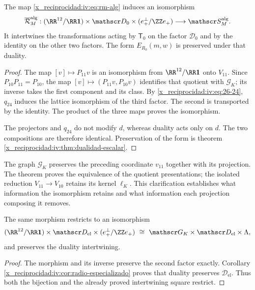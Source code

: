 \begin{theorem}
\label{x_reciprocidad:iv:thm:pantallas-isomorfas}
\label{x_reciprocidad:thm:k-pantallas-coordinadas}
The map \eqref{x_reciprocidad:iv:eq:rm-alg} induces an isomorphism
\[
 \overline{\mathcal R}_M^{\mathrm{alg}}:
 (\RR^{12}/\RR\mathbf1)\times\mathscr D_0
 \times(e_+^\perp/\ZZ e_+)
 \longrightarrow\mathscr S_M^{\mathrm{alg}}.
\]
It intertwines the transformations acting by \(\mathsf T_0\)
on the factor \(\mathscr D_0\) and by the identity on the
other two factors. The form \(E_{R_0}(m,w)\) is preserved
under that duality.
\end{theorem}
\begin{proof}
The map \([v]\mapsto P_{11}v\) is an isomorphism
from \(\RR^{12}/\RR\mathbf1\) onto \(V_{11}\).
Since \(P_{10}P_{11}=P_{10}\), the map
\([v]\mapsto(P_{11}v,P_{10}v)\) identifies that quotient
with \(\mathscr G_K\); its inverse takes the first component
and its class. By \eqref{x_reciprocidad:iv:eq:26-24}, \(q_{24}\) induces the
lattice isomorphism of the third factor. The second is
transported by the identity. The product of the three
maps proves the isomorphism.

The projectors and \(q_{24}\) do not modify \(d\), whereas
duality acts only on \(d\). The two
compositions are therefore identical. Preservation of the form
is theorem \ref{x_reciprocidad:iv:thm:dualidad-escalar}.
\end{proof}

The graph \(\mathscr G_K\) preserves the preceding coordinate
\(v_{11}\) together with its projection. The theorem proves
the equivalence of the quotient presentations; the isolated
reduction \(V_{11}\to V_{10}\) retains its kernel
\(\ell_K\). This clarification establishes what information
the isomorphism retains and what information each
projection composing it removes.

\begin{corollary}
The same morphism restricts to an isomorphism
\[
 (\RR^{12}/\RR\mathbf1)\times\mathscr D_{\mathrm{el}}
 \times(e_+^\perp/\ZZ e_+)
 \ \cong\ \mathscr G_K\times\mathscr D_{\mathrm{el}}\times\Lambda,
\]
and preserves the duality intertwining.
\end{corollary}
\begin{proof}
The morphism and its inverse preserve the second factor exactly.
Corollary \ref{x_reciprocidad:iv:cor:radio-especializado} proves that duality
preserves \(\mathscr D_{\mathrm{el}}\). Thus both the bijection and
the already proved intertwining square restrict.
\end{proof}

